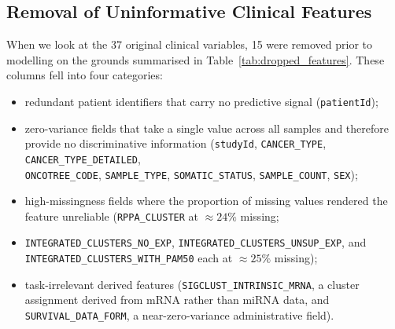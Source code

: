 \subsection{Removal of Uninformative Clinical Features}
\label{subsec:clinical_drop}

When we look at the 37 original clinical variables, 15 were removed prior to modelling on
the grounds summarised in Table~\ref{tab:dropped_features}. These columns
fell into four categories: 

\begin{itemize}
    \item redundant patient identifiers that carry no predictive signal (\texttt{patientId}); 
    \item zero-variance fields that take a single value across all samples and therefore provide no discriminative information (\texttt{studyId}, \texttt{CANCER\_TYPE}, \texttt{CANCER\_TYPE\_DETAILED}, \\ \texttt{ONCOTREE\_CODE}, \texttt{SAMPLE\_TYPE}, \texttt{SOMATIC\_STATUS}, \texttt{SAMPLE\_COUNT}, \texttt{SEX});
    \item high-missingness fields where the proportion of missing values rendered the feature unreliable (\texttt{RPPA\_CLUSTER} at ${\approx}24\%$ missing; 
    \item \texttt{INTEGRATED\_CLUSTERS\_NO\_EXP}, \texttt{INTEGRATED\_CLUSTERS\_UNSUP\_EXP}, and  \\ \texttt{INTEGRATED\_CLUSTERS\_WITH\_PAM50} each at ${\approx}25\%$ missing);
    \item task-irrelevant derived features (\texttt{SIGCLUST\_INTRINSIC\_MRNA}, a cluster assignment derived from mRNA rather than miRNA data, and \texttt{SURVIVAL\_DATA\_FORM}, a near-zero-variance administrative field).
\end{itemize}


